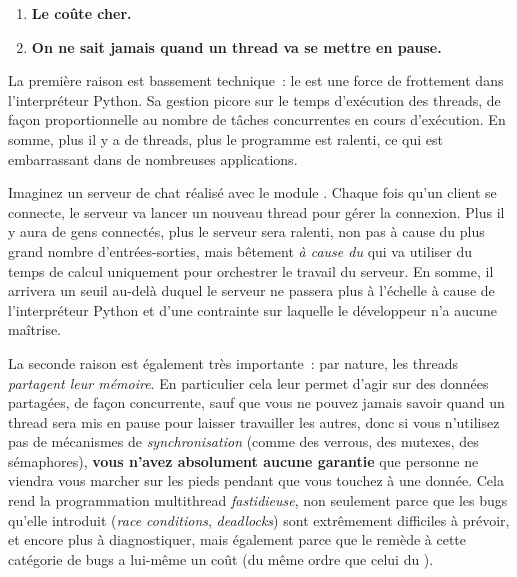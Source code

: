 \documentclass[small]{zmdocument}
\begin{document}
\begin{enumerate}
\item\relax \textbf{Le  coûte cher.}
\item\relax \textbf{On ne sait jamais quand un thread va se mettre en pause.}
\end{enumerate}


La première raison est bassement technique : le  est une force de frottement dans l’interpréteur Python. Sa gestion picore sur le temps d’exécution des threads, de façon proportionnelle au nombre de tâches concurrentes en cours d’exécution. En somme, plus il y a de threads, plus le programme est ralenti, ce qui est embarrassant dans de nombreuses applications.



Imaginez un serveur de chat réalisé avec le module . Chaque fois qu’un client se connecte, le serveur va lancer un nouveau thread pour gérer la connexion. Plus il y aura de gens connectés, plus le serveur sera ralenti, non pas à cause du plus grand nombre d’entrées-sorties, mais bêtement \textit{à cause du } qui va utiliser du temps de calcul uniquement pour orchestrer le travail du serveur. En somme, il arrivera un seuil au-delà duquel le serveur ne passera plus à l’échelle à cause de l’interpréteur Python et d’une contrainte sur laquelle le développeur n’a aucune maîtrise.



La seconde raison est également très importante : par nature, les threads \textit{partagent leur mémoire}. En particulier cela leur permet d’agir sur des données partagées, de façon concurrente, sauf que vous ne pouvez jamais savoir quand un thread sera mis en pause pour laisser travailler les autres, donc si vous n’utilisez pas de mécanismes de \textit{synchronisation} (comme des verrous, des mutexes, des sémaphores), \textbf{vous n’avez absolument aucune garantie} que personne ne viendra vous marcher sur les pieds pendant que vous touchez à une donnée. Cela rend la programmation multithread \textit{fastidieuse}, non seulement parce que les bugs qu’elle introduit (\textit{race conditions}, \textit{deadlocks}) sont extrêmement difficiles à prévoir, et encore plus à diagnostiquer, mais également parce que le remède à cette catégorie de bugs a lui-même un coût (du même ordre que celui du ).
\end{document}
